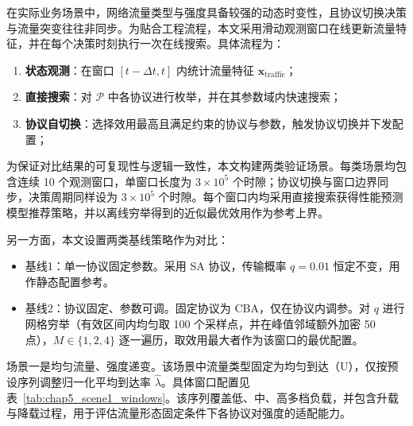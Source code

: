 在实际业务场景中，网络流量类型与强度具备较强的动态时变性，且协议切换决策与流量突变往往非同步。为贴合工程流程，本文采用滑动观测窗口在线更新流量特征，并在每个决策时刻执行一次在线搜索。具体流程为：
\begin{enumerate}[leftmargin=*]
	\item \textbf{状态观测}：在窗口 $[t-\Delta t, t]$ 内统计流量特征 $\mathbf{x}_{\text{traffic}}$；
	\item \textbf{直接搜索}：对 $\mathcal{P}$ 中各协议进行枚举，并在其参数域内快速搜索；
	\item \textbf{协议自切换}：选择效用最高且满足约束的协议与参数，触发协议切换并下发配置；
\end{enumerate}

为保证对比结果的可复现性与逻辑一致性，本文构建两类验证场景。每类场景均包含连续 10 个观测窗口，单窗口长度为 $3\times10^5$ 个时隙；协议切换与窗口边界同步，决策周期同样设为 $3\times10^5$ 个时隙。每个窗口内均采用直接搜索获得性能预测模型推荐策略，并以离线穷举得到的近似最优效用作为参考上界。

另一方面，本文设置两类基线策略作为对比：
\begin{itemize}[leftmargin=*]
	\item 基线1：单一协议固定参数。采用 SA 协议，传输概率 $q=0.01$ 恒定不变，用作静态配置参考。
	\item 基线2：协议固定、参数可调。固定协议为 CBA，仅在协议内调参。对 $q$ 进行网格穷举（有效区间内均匀取 100 个采样点，并在峰值邻域额外加密 50 点），$M\in\{1,2,4\}$ 逐一遍历，取效用最大者作为该窗口的最优配置。
\end{itemize}

场景一是均匀流量、强度递变。该场景中流量类型固定为均匀到达（U），仅按预设序列调整归一化平均到达率 $\hat{\lambda}$。具体窗口配置见表~\ref{tab:chap5_scene1_windows}。该序列覆盖低、中、高多档负载，并包含升载与降载过程，用于评估流量形态固定条件下各协议对强度的适配能力。

